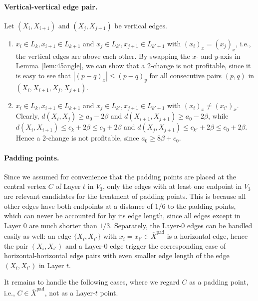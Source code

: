 \documentclass[11pt,DIV=12,a4paper]{scrartcl}
\newcommand{\pad}{\mathrm{pad}}
\begin{document}
\paragraph{Vertical-vertical edge pair.} Let $(X_i,X_{i+1})$ and $(X_j, X_{j+1})$ be vertical edges. 

\begin{enumerate}
\item $x_i \in L_k, x_{i+1} \in L_{k+1}$ and $x_j \in L_{k'}, x_{j+1} \in L_{k'+1}$ with $(x_i)_x = (x_j)_x$, i.e., the vertical edges are above each other. By swapping the $x$- and $y$-axis in Lemma~\ref{lem:45angle}, we can show that a 2-change is not profitable, since it is easy to see that $|(p-q)_x| \le (p-q)_y$ for all consecutive pairs $(p,q)$ in $(X_i, X_{i+1}, X_j, X_{j+1})$. 
\item $x_i \in L_k, x_{i+1} \in L_{k+1}$ and $x_j \in L_{k'}, x_{j+1} \in L_{k'+1}$ with $(x_i)_x \ne (x_{i'})_x$.
Clearly, $d(X_i, X_j) \ge a_0 - 2\beta$ and $d(X_{i+1}, X_{j+1}) \ge a_0 - 2\beta$, while $d(X_i, X_{i+1}) \le c_k +2\beta \le c_0 + 2\beta$ and $d(X_j, X_{j+1})\le c_{k'} + 2\beta \le c_0 + 2\beta$. Hence a 2-change is not profitable, since $a_0 \ge 8\beta + c_0$.
\end{enumerate}


\paragraph{Padding points.}

Since we assumed for convenience that the padding points are placed at the central vertex $C$ of Layer $t$ in $V_3$, only the edges with at least one endpoint in $V_3$ are relevant candidates for the treatment of padding points. This is because all other edges have both endpoints at a distance of $1/6$ to the padding points, which can never be accounted for by its edge length, since all edges except in Layer 0 are much shorter than $1/3$. Separately, the Layer-0 edges can be handled easily as well: an edge $\{X_i, X_{i'}\}$ with $x_i = x_{i'}\in \overline{X}^\pad$ is a horizontal edge, hence the pair $(X_i,X_{i'})$ and a Layer-0 edge trigger the corresponding case of horizontal-horizontal edge pairs with even smaller edge length of the edge $(X_i,X_{i'})$ in Layer $t$.

It remains to handle the following cases, where we regard $C$ as a padding point, i.e., $C\in \overline{X}^\pad$, not as a Layer-$t$ point. 
\end{document}
